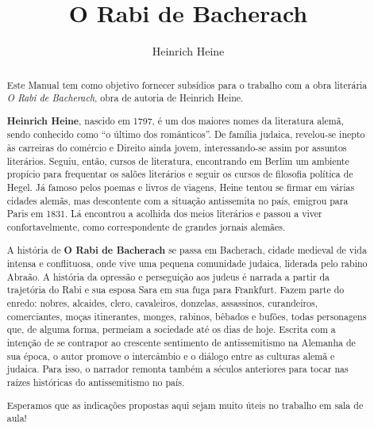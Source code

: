 \documentclass[12pt]{extarticle}
\begin{document}
\newcommand{\AutorLivro}{Heinrich Heine}
\newcommand{\TituloLivro}{O Rabi de Bacherach}
\newcommand{\Tema}{Ficção, mistério e fantasia}
\newcommand{\Genero}{Romance}
\newcommand{\imagemCapa}{./images/PNLD0018-01.png}
\newcommand{\issnppub}{---}
\newcommand{\issnepub}{---}
\newcommand{\colaborador}{\textbf{Michelle Etienne Florence, Bruno Gradella e Vicente Castro}}


\title{\TituloLivro}
\author{\AutorLivro}
\def\authornotes{\colaborador}

\date{}
\maketitle

\baselineskip\par

\begin{abstract}

Este Manual tem como objetivo fornecer subsídios para o trabalho com a
obra literária \emph{O Rabi de Bacherach}, obra de autoria de Heinrich
Heine.

\textbf{Heinrich Heine}, nascido em 1797, é um dos maiores nomes da literatura alemã,
sendo conhecido como ``o último dos românticos''.
De família judaica, revelou-se inepto às carreiras do comércio e Direito ainda 
jovem, interessando-se assim por assuntos literários. Seguiu, então, cursos de 
literatura, encontrando em Berlim um ambiente propício para frequentar os salões 
literários e seguir os cursos de filosofia política de Hegel.
Já famoso pelos poemas e livros de viagens, Heine tentou se firmar em várias
cidades alemãs, mas descontente com a situação antissemita no país, emigrou
para Paris em 1831. Lá encontrou a acolhida dos meios literários e passou a
viver confortavelmente, como correspondente de grandes jornais alemães.

A história de \textbf{O Rabi de Bacherach} se passa em Bacherach, cidade medieval 
de vida intensa e conflituosa, onde vive uma pequena comunidade judaica, liderada pelo
rabino Abraão. A história da opressão e perseguição aos judeus é narrada a
partir da trajetória do Rabi e sua esposa Sara em sua fuga para Frankfurt.
Fazem parte do enredo: nobres, alcaides, clero, cavaleiros, donzelas, assassinos, 
curandeiros, comerciantes, moças itinerantes, monges, rabinos, bêbados e bufões, 
todas personagens que, de alguma forma, permeiam a sociedade até os dias de hoje.
Escrita com a intenção de se contrapor ao crescente sentimento de antissemitismo
na Alemanha de sua época, o autor promove o intercâmbio e o diálogo entre as culturas 
alemã e judaica. Para isso, o narrador remonta também a séculos anteriores para tocar 
nas raízes históricas do antissemitismo no país.

Esperamos que as indicações propostas aqui sejam muito úteis no trabalho em
sala de aula! 



\end{abstract}
\end{document}
